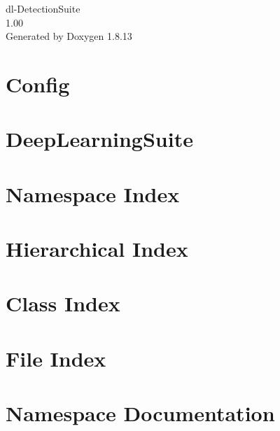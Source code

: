 \documentclass[twoside]{book}
\newcommand{\+}{\discretionary{\mbox{\scriptsize$\hookleftarrow$}}{}{}}
\newcommand{\clearemptydoublepage}{%
  \newpage{\pagestyle{empty}\cleardoublepage}%
}
\begin{document}
\hypersetup{pageanchor=false,
             bookmarksnumbered=true,
             pdfencoding=unicode
            }
\begin{titlepage}
\vspace*{7cm}
\begin{center}%
{\Large dl-\/\+Detection\+Suite \\[1ex]\large 1.\+00 }\\
\vspace*{1cm}
{\large Generated by Doxygen 1.8.13}\\
\end{center}
\end{titlepage}
\clearemptydoublepage
{}
\tableofcontents
\clearemptydoublepage
{}
\hypersetup{pageanchor=true}

\chapter{Config}
\label{index}\hypertarget{index}{}
\chapter{Deep\+Learning\+Suite}
\label{md__r_e_a_d_m_e}

\chapter{Namespace Index}

\chapter{Hierarchical Index}

\chapter{Class Index}

\chapter{File Index}

\chapter{Namespace Documentation}
























\end{document}
